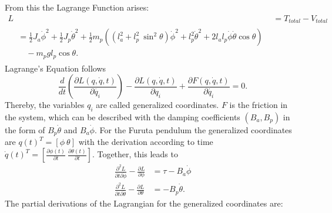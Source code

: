 From this the Lagrange Function arises:
\begin{align*}
L &=T_{total}-V_{total}\\
\begin{split}&=\frac{1}{2}J_a\dot{\phi}^2+\frac{1}{2}J_p\dot{\theta}^2+\frac{1}{2}m_p\left((l_a^2+l_p^2\
\sin^2\theta)\dot{\phi}^2+l_p^2\dot{\theta}^2+2l_al_p\dot{\phi}\dot{\theta}\cos 
\theta\right) \\&\quad - m_pgl_{p}\cos\theta.\end{split}
\end{align*}
 Lagrange's 
Equation follows \[ 
\frac{d}{dt}\left(\frac{\partial L(q, \dot{q},t)}{\partial 
	\dot{q_i}}\right)-\frac{\partial 
	L(q, \dot{q},t)}{\partial 
	q_i}+\frac{\partial F(q, \dot{q}, t)}{\partial \dot{q_i}} =0.\] Thereby, 
	the 
	variables 
	$q_i$ are called 
	generalized coordinates. $F$ is the friction in 
	the system, which can be described with the damping coefficients 
	$(B_a, B_p)$ in the form of $B_p\dot{\theta}$ and $ 
	B_a\dot{\phi}$.
	For 
the Furuta pendulum the generalized coordinates are $q(t)^T=[\phi \ \theta]$ 
with 
the derivation according to time $\dot{q}(t)^T = 
\left[\frac{\partial 
	\phi(t)}{\partial t}\ \frac{\partial \theta(t)}{\partial t} \right]$. 
	Together, this
	leads 
to 
\begin{align}
\frac{\partial^2 L}{\partial t\partial \dot{\phi}}-\frac{\partial 
	L}{\partial \phi}&=\tau - B_a\dot{\phi} \label{eq:f1}\\
\frac{\partial^2 L}{\partial t\partial \dot{\theta}}-\frac{\partial 
	L}{\partial \theta}&=-B_p\dot{\theta}\label{eq:f2}.
\end{align}
The partial derivations of the Lagrangian for the generalized coordinates are:

